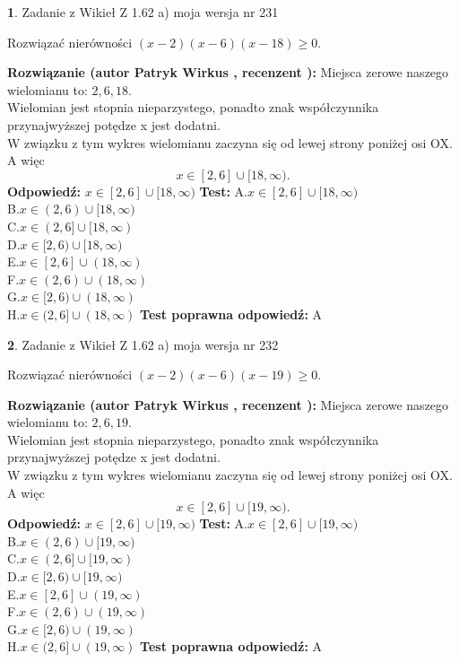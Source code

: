\documentclass[12pt, a4paper]{article}
\theoremstyle{definition} %
\newtheorem{zad}{}
\newcommand{\zadStart}[1]{\begin{zad}#1\newline}
\newcommand{\zadStop}{\end{zad}}
\newcommand{\rozwStart}[2]{\noindent \textbf{Rozwiązanie (autor #1 , recenzent #2): }\newline}
\newcommand{\rozwStop}{\newline}
\newcommand{\odpStart}{\noindent \textbf{Odpowiedź:}\newline}
\newcommand{\odpStop}{\newline}
\newcommand{\testStart}{\noindent \textbf{Test:}\newline}
\newcommand{\testStop}{\newline}
\newcommand{\kluczStart}{\noindent \textbf{Test poprawna odpowiedź:}\newline}
\newcommand{\kluczStop}{\newline}
\begin{document}
\zadStart{Zadanie z Wikieł Z 1.62 a) moja wersja nr 231}

Rozwiązać nierówności $(x-2)(x-6)(x-18)\ge0$.
\zadStop
\rozwStart{Patryk Wirkus}{}
Miejsca zerowe naszego wielomianu to: $2, 6, 18$.\\
Wielomian jest stopnia nieparzystego, ponadto znak współczynnika przy\linebreak najwyższej potędze x jest dodatni.\\ W związku z tym wykres wielomianu zaczyna się od lewej strony poniżej osi OX. A więc $$x \in [2,6] \cup [18,\infty).$$
\rozwStop
\odpStart
$x \in [2,6] \cup [18,\infty)$
\odpStop
\testStart
A.$x \in [2,6] \cup [18,\infty)$\\
B.$x \in (2,6) \cup [18,\infty)$\\
C.$x \in (2,6] \cup [18,\infty)$\\
D.$x \in [2,6) \cup [18,\infty)$\\
E.$x \in [2,6] \cup (18,\infty)$\\
F.$x \in (2,6) \cup (18,\infty)$\\
G.$x \in [2,6) \cup (18,\infty)$\\
H.$x \in (2,6] \cup (18,\infty)$
\testStop
\kluczStart
A
\kluczStop



\zadStart{Zadanie z Wikieł Z 1.62 a) moja wersja nr 232}

Rozwiązać nierówności $(x-2)(x-6)(x-19)\ge0$.
\zadStop
\rozwStart{Patryk Wirkus}{}
Miejsca zerowe naszego wielomianu to: $2, 6, 19$.\\
Wielomian jest stopnia nieparzystego, ponadto znak współczynnika przy\linebreak najwyższej potędze x jest dodatni.\\ W związku z tym wykres wielomianu zaczyna się od lewej strony poniżej osi OX. A więc $$x \in [2,6] \cup [19,\infty).$$
\rozwStop
\odpStart
$x \in [2,6] \cup [19,\infty)$
\odpStop
\testStart
A.$x \in [2,6] \cup [19,\infty)$\\
B.$x \in (2,6) \cup [19,\infty)$\\
C.$x \in (2,6] \cup [19,\infty)$\\
D.$x \in [2,6) \cup [19,\infty)$\\
E.$x \in [2,6] \cup (19,\infty)$\\
F.$x \in (2,6) \cup (19,\infty)$\\
G.$x \in [2,6) \cup (19,\infty)$\\
H.$x \in (2,6] \cup (19,\infty)$
\testStop
\kluczStart
A
\kluczStop
\end{document}
